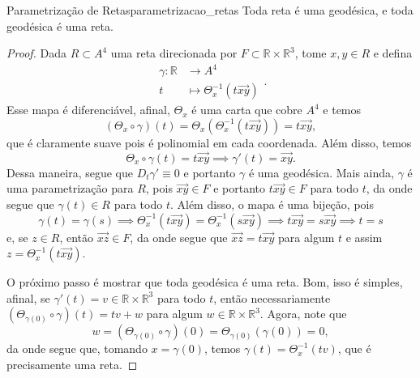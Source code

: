 \documentclass[a4paper,12pt]{book}
\begin{document}
\begin{prop}{Parametrização de Retas}{parametrizacao_retas}
  Toda reta é uma geodésica, e toda geodésica é uma reta.
\end{prop}
\begin{proof}
  Dada $R \subset A^4$ uma reta direcionada por $F \subset \mathbb{R} \times \mathbb{R}^3$, tome $x, y \in R$ e defina \begin{equation*}
    \begin{split}
      \gamma \colon \mathbb{R} &\to A^4 \\ t &\mapsto \Theta_x^{-1}(t\overrightarrow{xy})
    \end{split}.
  \end{equation*}
  Esse mapa é diferenciável, afinal, $\Theta_x$ é uma carta que cobre $A^4$ e temos \begin{equation*}
    (\Theta_x \circ \gamma)(t) = \Theta_x(\Theta_x^{-1}(t\overrightarrow{xy})) = t\overrightarrow{xy},
  \end{equation*} que é claramente suave pois é polinomial em cada coordenada. Além disso, temos \begin{equation*}
    \Theta_x \circ \gamma(t) = t\overrightarrow{xy} \implies \gamma'(t) = \overrightarrow{xy}.
  \end{equation*} Dessa maneira, segue que $D_t\gamma' \equiv 0$ e portanto $\gamma$ é uma geodésica. Mais ainda, $\gamma$ é uma parametrização para $R$, pois $\overrightarrow{xy} \in F$ e portanto $t\overrightarrow{xy} \in F$ para todo $t$, da onde segue que $\gamma(t) \in R$ para todo $t$. Além disso, o mapa é uma bijeção, pois \begin{equation*}
    \gamma(t) = \gamma(s) \implies \Theta_x^{-1}(t\overrightarrow{xy}) = \Theta_x^{-1}(s\overrightarrow{xy}) \implies t\overrightarrow{xy} = s\overrightarrow{xy} \implies t = s
  \end{equation*} e, se $z \in R$, então $\overrightarrow{xz} \in F$, da onde segue que $\overrightarrow{xz} = t\overrightarrow{xy}$ para algum $t$ e assim $z = \Theta_x^{-1}(t\overrightarrow{xy})$.

  O próximo passo é mostrar que toda geodésica é uma reta.  Bom, isso é simples, afinal, se $\gamma'(t) = v \in \mathbb{R} \times \mathbb{R}^3$ para todo $t$, então necessariamente $(\Theta_{\gamma(0)} \circ \gamma)(t) = tv + w$ para algum $w \in \mathbb{R} \times \mathbb{R}^3$. Agora, note que \begin{equation*}
    w = (\Theta_{\gamma(0)} \circ \gamma)(0) = \Theta_{\gamma(0)}(\gamma(0)) = 0,
  \end{equation*} da onde segue que, tomando $x = \gamma(0)$, temos $\gamma(t) = \Theta^{-1}_x(tv)$, que é precisamente uma reta.
\end{proof}
\end{document}
